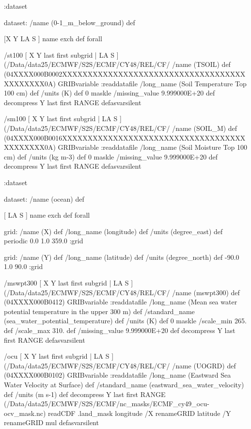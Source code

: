 \begin{ingrid}
:dataset

dataset:
/name (0-1_m_below_ground) def

[X Y LA S ] {name exch def } forall

/st100 { [ X Y last first subgrid | LA S ] (/Data/data25/ECMWF/S2S/ECMF/CY48/REL/CF/%
/name (TSOIL) def
(04XXXX000B0002XXXXXXXXXXXXXXXXXXXXXXXXXXXXXXXXXXXXXXXXXXXX0A) GRIBvariable
:readdatafile
/long_name (Soil Temperature Top 100 cm) def
/units (K) def
0 maskle
/missing_value 9.999000E+20 def
decompress
Y last first RANGE
} defasvarsilent

/sm100 { [ X Y last first subgrid | LA S ] (/Data/data25/ECMWF/S2S/ECMF/CY48/REL/CF/%
/name (SOIL_M) def
(04XXXX000B0016XXXXXXXXXXXXXXXXXXXXXXXXXXXXXXXXXXXXXXXXXXXX0A) GRIBvariable
:readdatafile
/long_name (Soil Moisture Top 100 cm) def
/units (kg m-3) def
0 maskle
/missing_value 9.999000E+20 def
decompress
Y last first RANGE
} defasvarsilent

:dataset

dataset:
/name (ocean) def

[ LA S ] {name exch def } forall

grid:
/name (X) def
/long_name (longitude) def
/units (degree_east) def
periodic
0.0 1.0 359.0
:grid

grid:
/name (Y) def
/long_name (latitude) def
/units (degree_north) def
-90.0 1.0 90.0
:grid

/mswpt300 { [ X Y last first subgrid | LA S ] (/Data/data25/ECMWF/S2S/ECMF/CY48/REL/CF/%
/name (mswpt300) def
(04XXXX000B0412) GRIBvariable
:readdatafile
/long_name (Mean sea water potential temperature in the upper 300 m) def
/standard_name (sea_water_potential_temperature) def
/units (K) def
0 maskle
/scale_min 265. def
/scale_max 310. def
/missing_value 9.999000E+20 def
decompress
Y last first RANGE
} defasvarsilent

/ocu { [ X Y last first subgrid | LA S ] (/Data/data25/ECMWF/S2S/ECMF/CY48/REL/CF/%
/name (UOGRD) def
(04XXXX000B0102) GRIBvariable
:readdatafile
/long_name (Eastward Sea Water Velocity at Surface) def
/standard_name (eastward_sea_water_velocity) def
/units (m s-1) def
decompress
 Y last first RANGE
 (/Data/data25/ECMWF/S2S/ECMF/nc_masks/ECMF_cy49_ocu-ocv_mask.nc) readCDF .land_mask
   longitude /X renameGRID
   latitude /Y renameGRID
mul
} defasvarsilent


\end{ingrid}
